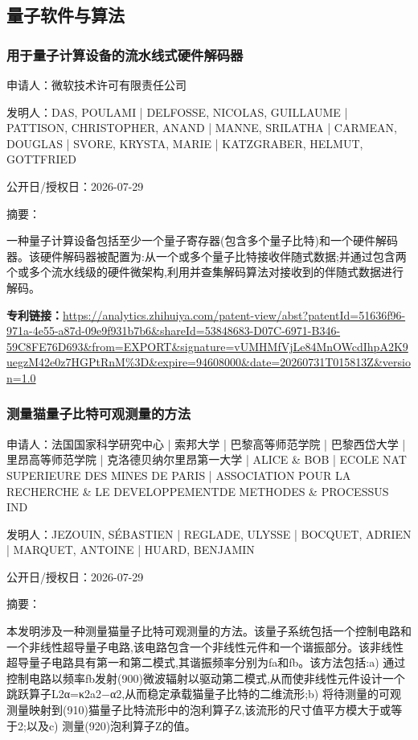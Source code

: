 \documentclass[12pt,a4paper]{ctexart}
\begin{document}
\subsection{ 量子软件与算法 }

\subsubsection{ 用于量子计算设备的流水线式硬件解码器 }

申请人：微软技术许可有限责任公司

发明人：DAS, POULAMI | DELFOSSE, NICOLAS, GUILLAUME | PATTISON, CHRISTOPHER, ANAND | MANNE, SRILATHA | CARMEAN, DOUGLAS | SVORE, KRYSTA, MARIE | KATZGRABER, HELMUT, GOTTFRIED

公开日/授权日：2026-07-29

摘要：

一种量子计算设备包括至少一个量子寄存器(包含多个量子比特)和一个硬件解码器。该硬件解码器被配置为:从一个或多个量子比特接收伴随式数据;并通过包含两个或多个流水线级的硬件微架构,利用并查集解码算法对接收到的伴随式数据进行解码。

\noindent\textbf{专利链接：}\url{https://analytics.zhihuiya.com/patent-view/abst?patentId=51636f96-971a-4e55-a87d-09e9f931b7b6&shareId=53848683-D07C-6971-B346-59C8FE76D693&from=EXPORT&signature=vUMHMfVjLe84MnOWcdIhpA2K9uegzM42e0z7HGPtRnM%3D&expire=94608000&date=20260731T015813Z&version=1.0}

\subsubsection{ 测量猫量子比特可观测量的方法 }

申请人：法国国家科学研究中心 | 索邦大学 | 巴黎高等师范学院 | 巴黎西岱大学 | 里昂高等师范学院 | 克洛德贝纳尔里昂第一大学 | ALICE \& BOB | ECOLE NAT SUPERIEURE DES MINES DE PARIS | ASSOCIATION POUR LA RECHERCHE \& LE DEVELOPPEMENTDE METHODES \& PROCESSUS IND

发明人：JEZOUIN, SÉBASTIEN | REGLADE, ULYSSE | BOCQUET, ADRIEN | MARQUET, ANTOINE | HUARD, BENJAMIN

公开日/授权日：2026-07-29

摘要：

本发明涉及一种测量猫量子比特可观测量的方法。该量子系统包括一个控制电路和一个非线性超导量子电路,该电路包含一个非线性元件和一个谐振部分。该非线性超导量子电路具有第一和第二模式,其谐振频率分别为fa和fb。该方法包括:a) 通过控制电路以频率fb发射(900)微波辐射以驱动第二模式,从而使非线性元件设计一个跳跃算子L2α=κ2a2−α2,从而稳定承载猫量子比特的二维流形;b) 将待测量的可观测量映射到(910)猫量子比特流形中的泡利算子Z,该流形的尺寸值平方模大于或等于2;以及c) 测量(920)泡利算子Z的值。
\end{document}
